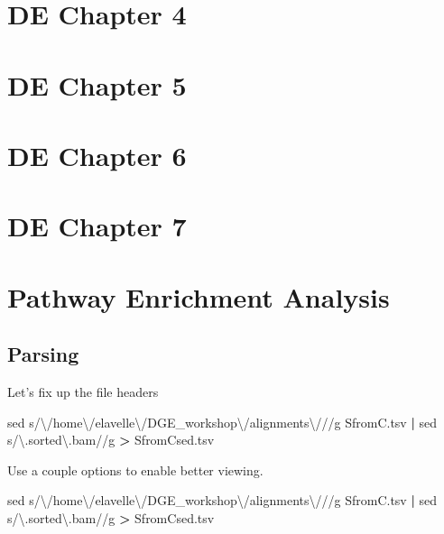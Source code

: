 \documentclass[
]{book}
\newenvironment{Shaded}{\begin{snugshade}}{\end{snugshade}}
\newcommand{\FunctionTok}[1]{\textcolor[rgb]{0.00,0.00,0.00}{#1}}
\newcommand{\KeywordTok}[1]{\textcolor[rgb]{0.13,0.29,0.53}{\textbf{#1}}}
\newcommand{\NormalTok}[1]{#1}
\newcommand{\OperatorTok}[1]{\textcolor[rgb]{0.81,0.36,0.00}{\textbf{#1}}}
\newcommand{\StringTok}[1]{\textcolor[rgb]{0.31,0.60,0.02}{#1}}
\begin{document}
\hypertarget{de-chapter-4}{%
\chapter{DE Chapter 4}\label{de-chapter-4}}

\hypertarget{de-chapter-5}{%
\chapter{DE Chapter 5}\label{de-chapter-5}}

\hypertarget{de-chapter-6}{%
\chapter{DE Chapter 6}\label{de-chapter-6}}

\hypertarget{de-chapter-7}{%
\chapter{DE Chapter 7}\label{de-chapter-7}}

\hypertarget{pathway-enrichment-analysis}{%
\chapter{Pathway Enrichment Analysis}\label{pathway-enrichment-analysis}}

\hypertarget{parsing}{%
\section{Parsing}\label{parsing}}

Let's fix up the file headers

\begin{Shaded}
\begin{Highlighting}[]
\FunctionTok{sed} \StringTok{\textquotesingle{}s/\textbackslash{}/home\textbackslash{}/elavelle\textbackslash{}/DGE\_workshop\textbackslash{}/alignments\textbackslash{}///g\textquotesingle{}}\NormalTok{ SfromC.tsv }\KeywordTok{|} \FunctionTok{sed} \StringTok{\textquotesingle{}s/\textbackslash{}.sorted\textbackslash{}.bam//g\textquotesingle{}} \OperatorTok{\textgreater{}}\NormalTok{ SfromCsed.tsv}
\end{Highlighting}
\end{Shaded}

Use a couple options to enable better viewing.

\begin{Shaded}
\begin{Highlighting}[]
\FunctionTok{sed} \StringTok{\textquotesingle{}s/\textbackslash{}/home\textbackslash{}/elavelle\textbackslash{}/DGE\_workshop\textbackslash{}/alignments\textbackslash{}///g\textquotesingle{}}\NormalTok{ SfromC.tsv }\KeywordTok{|} \FunctionTok{sed} \StringTok{\textquotesingle{}s/\textbackslash{}.sorted\textbackslash{}.bam//g\textquotesingle{}} \OperatorTok{\textgreater{}}\NormalTok{ SfromCsed.tsv}
\end{Highlighting}
\end{Shaded}
\end{document}
